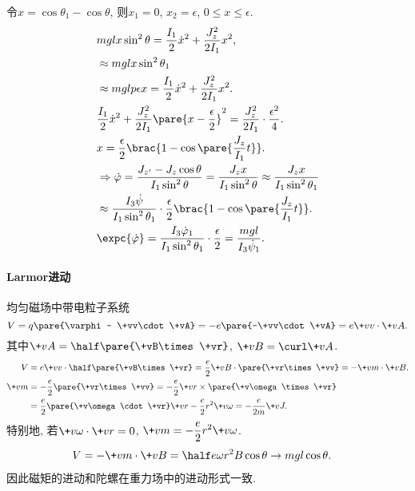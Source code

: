 \documentclass[../LectureNotes.tex]{subfiles}
\begin{document}
令$x = \cos\theta_1 - \cos\theta$, 则$x_1 = 0$, $x_2 = \epsilon$, $0 \le x \le \epsilon$.
\begin{align*}
    & mglx\sin^2\theta = \frac{I_1}{2}\dot x^2 + \frac{J_z^2}{2I_1}x^2, \\
    & \approx mglx\sin^2\theta_1 \\
    & \approx mglp\epsilon x = \frac{I_1}{2}\dot x^2 + \frac{J_z^2}{2I_1}x^2. \\
    & \frac{I_1}{2}\dot x^2 + \frac{J_z^2}{2I_1}\pare{x-\frac{\epsilon}{2}}^2 = \frac{J_z^2}{2I_1} \cdot \frac{\epsilon^2}{4}. \\
    & x = \frac{\epsilon}{2} \brac{1-\cos\pare{\frac{J_z}{I_1}t}}. \\
    & \Rightarrow \dot\varphi = \frac{J_{z'} - J_z\cos\theta}{I_1\sin^2\theta} = \frac{J_z x}{I_1\sin^2\theta} \approx \frac{J_z x}{I_1\sin^2\theta_1} \\ &\approx \frac{I_3\dot\psi }{I_1\sin^2\theta_1} \cdot \frac{\epsilon}{2}\brac{1-\cos\pare{\frac{J_z}{I_1}t}}. \\
    & \expc{\dot\varphi} = \frac{I_3\dot\varphi_1}{I_1\sin^2\theta_1}\cdot \frac{\epsilon}{2} = \frac{mgl}{I_3\dot\psi_1}.
\end{align*}


\paragraph{Larmor进动} %
\label{par:larmor进动}

均匀磁场中带电粒子系统
\[ V = q\pare{\varphi - \+vv\cdot\+vA} = -e\pare{-\+vv\cdot\+vA} = e\+vv\cdot\+vA. \]
其中$\displaystyle \+vA = \half\pare{\+vB\times\+vr}$, $\+vB = \curl \+vA$.
\begin{align*}
    V &= e\+vv \cdot \half\pare{\+vB\times\+vr} = \frac{e}{2}\+vB\cdot\pare{\+vr\times\+vv} = -\+vm\cdot \+vB. \\
    \+vm &= -\frac{e}{2}\pare{\+vr\times\+vv} = -\frac{e}{2}\+vr\times\pare{\+v\omega\times\+vr} \\
    &= \frac{e}{2}\pare{\+v\omega\cdot\+vr}\+vr - \frac{e}{2}r^2\+v\omega = -\frac{e}{2m}\+vJ.
\end{align*}
特别地, 若$\+v\omega\cdot\+vr = 0$, $\+vm = \displaystyle -\frac{e}{2}r^2\+v\omega$.
\begin{align*}
    V &= -\+vm\cdot\+vB = \half e\omega r^2 B\cos\theta \rightarrow mgl\cos\theta.
\end{align*}
因此磁矩的进动和陀螺在重力场中的进动形式一致.




\end{document}
